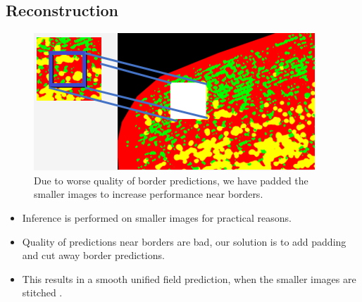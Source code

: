 \documentclass[
    ,title     = {{Image Segmentation for Smart Agriculture}}
    ,subject   = {{This is the subject of my work}}
    ,papersize = {{a1paper}}
    ,nocrop
]{dtuposter}
\begin{document}
\begin{dtupostercontent}
\section{Reconstruction}
\begin{figure}
	\centering
	\includegraphics[width=0.6\linewidth]{"Reconstruction DL"}
	\caption{Due to worse quality of border predictions, we have padded the smaller images to increase performance near borders.}
	\label{fig:reconstruction-dl}
\end{figure}
\begin{itemize}
	\item Inference is performed on smaller images for practical reasons.
	\item Quality of predictions near borders are bad, our solution is to add padding and cut away border predictions.
	\item This results in a smooth unified field prediction, when the smaller images are stitched .
\end{itemize}


\end{dtupostercontent}
\end{document}
